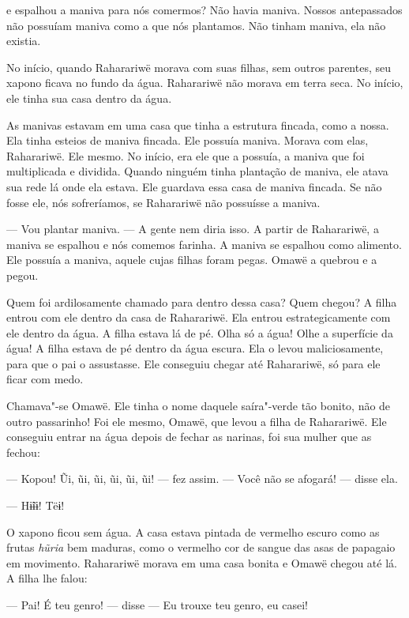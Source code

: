  

 e espalhou a maniva para nós comermos? Não havia maniva.
Nossos antepassados não possuíam maniva como a que nós plantamos. Não
tinham maniva, ela não existia. 

No início, quando Raharariwë morava com suas filhas, sem outros
parentes, seu xapono ficava no fundo da água. Raharariwë não morava em
terra seca. No início, ele tinha sua casa dentro da água. 

As manivas estavam em uma casa que tinha a estrutura fincada, como a
nossa. Ela tinha esteios de maniva fincada. Ele possuía maniva. Morava
com elas, Raharariwë. Ele mesmo. No início, era ele que a possuía, a
maniva que foi multiplicada e dividida. Quando ninguém tinha plantação
de maniva, ele atava sua rede lá onde ela estava. Ele guardava essa casa
de maniva fincada. Se não fosse ele, nós sofreríamos, se Raharariwë não
possuísse a maniva. 

--- Vou plantar maniva. --- A gente nem diria isso. A partir de
Raharariwë, a maniva se espalhou e nós comemos farinha. A maniva se
espalhou como alimento. Ele possuía a maniva, aquele cujas filhas foram
pegas. Omawë a quebrou e a pegou.

Quem foi ardilosamente chamado para dentro dessa casa? Quem chegou? A
filha entrou com ele dentro da casa de Raharariwë. Ela
entrou estrategicamente com ele dentro da água. A filha estava lá de pé.
Olha só a água! Olhe a superfície da água! A filha estava de pé dentro
da água escura. Ela o levou maliciosamente, para que o pai o assustasse.
Ele conseguiu chegar até Raharariwë, só para ele ficar com medo. 

Chamava"-se Omawë. Ele tinha o nome daquele saíra"-verde tão bonito, não
de outro passarinho! Foi ele mesmo, Omawë, que levou a filha de
Raharariwë. Ele conseguiu entrar na água depois de fechar as narinas,
foi sua mulher que as fechou:

--- Kopou! Ũi, ũi, ũi, ũi, ũi, ũi! --- fez assim. --- Você não se
afogará! --- disse ela. 

--- Hɨ̃ɨɨ! Tëɨ! 

O xapono ficou sem água. A casa estava pintada de vermelho escuro como
as frutas \emph{hũria} bem maduras, como o vermelho cor de sangue das
asas de papagaio em movimento. Raharariwë morava em uma casa bonita e
Omawë chegou até lá. A filha lhe falou:

--- Pai! É teu genro! --- disse --- Eu trouxe teu genro, eu casei! 

